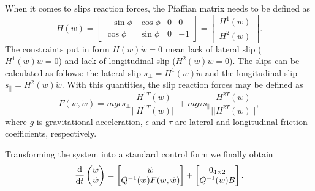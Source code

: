 When it comes to slips reaction forces, the Pfaffian matrix needs to be defined as
\begin{equation}
H(w)=\begin{bmatrix}
-\sin\phi & \cos\phi & 0 & 0\\
\cos\phi & \sin\phi & 0 & -1
\end{bmatrix}=\begin{bmatrix}
H^1(w)\\
H^2(w)
\end{bmatrix}.
\end{equation}
The constraints put in form $H(w)\dot{w}=0$ mean lack of lateral slip ($H^1(w)\dot{w}=0$) and lack of
longitudinal slip ($H^2(w)\dot{w}=0$).
The slips can be calculated as follows: the lateral slip $s_\perp=H^1(w)\dot w$ and the longitudinal slip $s_\parallel=H^2(w)\dot w$. With this quantities, the slip reaction forces may be defined as 
\begin{equation}
F(w, \dot w)=mg\epsilon s_\perp\frac{H^{1T}(w)}{||H^{1T}(w)||} + mg\tau s_\parallel\frac{H^{2T}(w)}{||H^{2T}(w)||},
\end{equation}
where $g$ is gravitational acceleration, $\epsilon$ and $\tau$ are lateral and longitudinal friction coefficients, respectively.

Transforming the system into a standard control form we finally obtain
\begin{equation}
\frac{\mathrm{d}}{\mathrm{d} t}\begin{pmatrix}
w \\ \dot w
\end{pmatrix}
 = 
 \begin{bmatrix}
 \dot w \\ Q^{-1}(w)F(w, \dot w)
 \end{bmatrix}+\begin{bmatrix}
 0_{4\times 2} \\ Q^{-1}(w)B
 \end{bmatrix}.
\end{equation}
